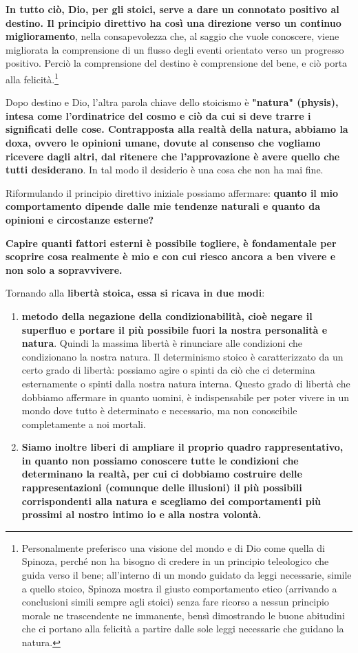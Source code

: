 \documentclass[a4paper,12pt,oneside]{article}%
\begin{document}
\textbf{In tutto ciò,  Dio, per gli stoici, serve a dare un connotato positivo al destino. Il principio direttivo ha così una direzione verso un continuo miglioramento}, nella consapevolezza che, al saggio che vuole conoscere, viene migliorata la comprensione di un flusso degli eventi orientato verso un progresso positivo. Perciò la comprensione del destino è comprensione del bene, e ciò porta alla felicità.\footnote{Personalmente preferisco una visione del mondo e di Dio come quella di Spinoza, perché non ha bisogno di credere in un principio teleologico che guida verso il bene; all'interno di un mondo guidato da leggi necessarie, simile a quello stoico, Spinoza mostra il giusto comportamento etico (arrivando a conclusioni simili sempre agli stoici) senza fare ricorso a nessun principio morale ne trascendente ne immanente, bensì dimostrando le buone abitudini che ci portano alla felicità a partire dalle sole leggi necessarie che guidano la natura. }

Dopo destino e Dio, l'altra parola chiave dello stoicismo è \textbf{"natura" (physis), intesa come l'ordinatrice del cosmo e ciò da cui si deve trarre i significati delle cose. Contrapposta alla realtà della natura, abbiamo la doxa, ovvero le opinioni umane, dovute al consenso che vogliamo ricevere dagli altri, dal ritenere che l'approvazione è avere quello che tutti desiderano}. In tal modo il desiderio è una cosa che non ha mai fine.

Riformulando il principio direttivo iniziale possiamo affermare:\textbf{ quanto il mio comportamento dipende dalle mie tendenze naturali e quanto da opinioni e circostanze esterne?}

\textbf{Capire quanti fattori esterni è possibile togliere, è fondamentale per scoprire cosa realmente è mio e con cui riesco ancora a ben vivere e non solo a sopravvivere.}

Tornando alla \textbf{libertà stoica, essa si ricava in due modi}:

\begin{enumerate}
	\item \textbf{metodo della negazione della condizionabilità, cioè negare il superfluo e portare il più possibile fuori la nostra personalità e natura}. Quindi la massima libertà è rinunciare alle condizioni che condizionano la nostra natura. Il determinismo stoico  è caratterizzato da un certo grado di libertà: possiamo agire o spinti da ciò che ci determina esternamente o spinti dalla nostra natura interna. Questo grado di libertà che dobbiamo affermare in quanto uomini, è indispensabile per poter vivere in un mondo dove tutto è determinato e necessario, ma non conoscibile completamente a noi mortali.
	
	\item \textbf{Siamo inoltre liberi di ampliare il proprio quadro rappresentativo, in quanto non possiamo conoscere tutte le condizioni che determinano la realtà, per cui ci dobbiamo costruire delle  rappresentazioni (comunque delle illusioni) il più possibili corrispondenti alla natura e scegliamo dei comportamenti più prossimi al nostro intimo io e alla nostra volontà. }
\end{enumerate}
\end{document}
